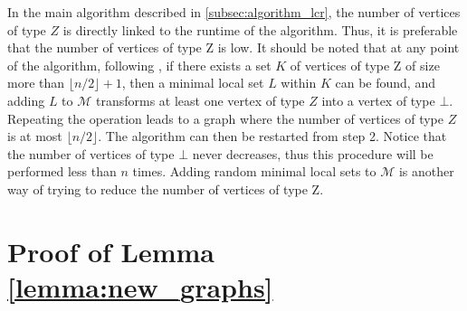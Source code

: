 \documentclass[a4paper,UKenglish,cleveref,autoref,thm-restate]{arxiv}
\begin{document}
\begin{remark}
    In the main algorithm described in \cref{subsec:algorithm_lcr}, the number of vertices of type $Z$ is directly linked to the runtime of the algorithm. Thus, it is preferable that the number of vertices of type Z is low. It should be noted that at any point of the algorithm, following \cite{claudet2024local}, if there exists a set $K$ of vertices of type Z of size more than $\lfloor n/2 \rfloor +1$, then a minimal local set $L$ within $K$ can be found, and adding $L$ to $\mathcal M$ transforms at least one vertex of type $Z$ into a vertex of type $\bot$. Repeating the operation leads to a graph where the number of vertices of type $Z$ is at most $\lfloor n/2 \rfloor$. The algorithm can then be restarted from step 2. Notice that the number of vertices of type $\bot$ never decreases, thus this procedure will be performed less than $n$ times. Adding random minimal local sets to $\mathcal M$ is another way of trying to reduce the number of vertices of type Z.
\end{remark}

\section{Proof of Lemma \ref{lemma:new_graphs}} \label{app:new_graphs}

\newgraphs*
\end{document}

